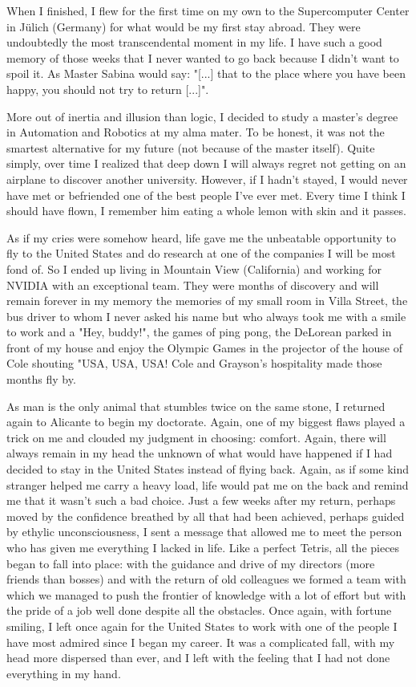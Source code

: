 When I finished, I flew for the first time on my own to the Supercomputer Center in Jülich (Germany) for what would be my first stay abroad. They were undoubtedly the most transcendental moment in my life. I have such a good memory of those weeks that I never wanted to go back because I didn't want to spoil it. As Master Sabina would say: "[...] that to the place where you have been happy, you should not try to return [...]".

More out of inertia and illusion than logic, I decided to study a master's degree in Automation and Robotics at my alma mater. To be honest, it was not the smartest alternative for my future (not because of the master itself). Quite simply, over time I realized that deep down I will always regret not getting on an airplane to discover another university. However, if I hadn't stayed, I would never have met or befriended one of the best people I've ever met. Every time I think I should have flown, I remember him eating a whole lemon with skin and it passes.

As if my cries were somehow heard, life gave me the unbeatable opportunity to fly to the United States and do research at one of the companies I will be most fond of. So I ended up living in Mountain View (California) and working for NVIDIA with an exceptional team. They were months of discovery and will remain forever in my memory the memories of my small room in Villa Street, the bus driver to whom I never asked his name but who always took me with a smile to work and a "Hey, buddy!", the games of ping pong, the DeLorean parked in front of my house and enjoy the Olympic Games in the projector of the house of Cole shouting "USA, USA, USA! Cole and Grayson's hospitality made those months fly by.

As man is the only animal that stumbles twice on the same stone, I returned again to Alicante to begin my doctorate. Again, one of my biggest flaws played a trick on me and clouded my judgment in choosing: comfort. Again, there will always remain in my head the unknown of what would have happened if I had decided to stay in the United States instead of flying back. Again, as if some kind stranger helped me carry a heavy load, life would pat me on the back and remind me that it wasn't such a bad choice. Just a few weeks after my return, perhaps moved by the confidence breathed by all that had been achieved, perhaps guided by ethylic unconsciousness, I sent a message that allowed me to meet the person who has given me everything I lacked in life. Like a perfect Tetris, all the pieces began to fall into place: with the guidance and drive of my directors (more friends than bosses) and with the return of old colleagues we formed a team with which we managed to push the frontier of knowledge with a lot of effort but with the pride of a job well done despite all the obstacles. Once again, with fortune smiling, I left once again for the United States to work with one of the people I have most admired since I began my career. It was a complicated fall, with my head more dispersed than ever, and I left with the feeling that I had not done everything in my hand.

